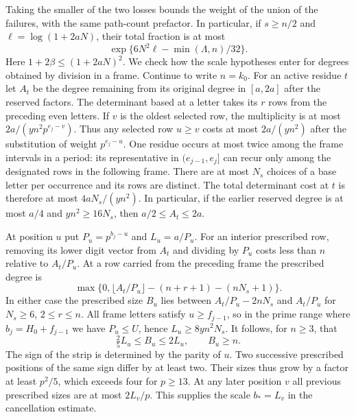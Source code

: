 \documentclass[11pt]{amsart}
\theoremstyle{definition}
\theoremstyle{remark}
\begin{document}
Taking the smaller of the two losses bounds the weight of the
union of the failures, with the same path-count prefactor.
In particular, if $s\ge n/2$ and $\ell=\log(1+2aN)$, their
total fraction is at most
\[
 \exp\{6N^2\ell-\min(\Lambda,n)/32\}.
\]
Here $1+2\beta\le(1+2aN)^2$. We check how the scale hypotheses
enter for degrees obtained by division in a frame. Continue to
write $n=k_0$. For an active residue $t$ let $A_t$ be the degree
remaining from its original degree in $[a,2a]$ after the reserved
factors. The determinant based at a letter takes its $r$ rows
from the preceding even letters. If $v$ is the oldest selected
row, the multiplicity is at most $2a/(yn^2p^{e_j-v})$.
Thus any selected row $u\ge v$ costs at most $2a/(yn^2)$ after
the substitution of weight $p^{e_j-u}$. One residue occurs at most
twice among the frame intervals in a period: its representative
in $(e_{j-1},e_j]$ can recur only among the designated rows in
the following frame. There are at most $N_s$ choices of a base
letter per occurrence and its rows are distinct. The total
determinant cost at $t$ is therefore at most $4aN_s/(yn^2)$.
In particular, if the earlier reserved degree is at most $a/4$
and $yn^2\ge16N_s$, then $a/2\le A_t\le2a$.

At position $u$ put $P_u=p^{b_j-u}$ and $L_u=a/P_u$.
For an interior prescribed row, removing its lower digit vector
from $A_t$ and dividing by $P_u$ costs less than $n$ relative
to $A_t/P_u$. At a row carried from the preceding frame the
prescribed degree is
\[
 \max\{0,\lfloor A_t/P_u\rfloor-(n+r+1)-(nN_s+1)\}.
\]
In either case the prescribed size $B_u$ lies between
$A_t/P_u-2nN_s$ and $A_t/P_u$ for $N_s\ge6$, $2\le r\le n$.
All frame letters satisfy $u\ge f_{j-1}$, so in the prime range
where $b_j=H_0+f_{j-1}$ we have $P_u\le U$, hence
$L_u\ge8yn^2N_s$. It follows, for $n\ge3$, that
\[
             \tfrac25 L_u\le B_u\le2L_u,\qquad B_u\ge n .
\]
The sign of the strip is determined by the parity of $u$.
Two successive prescribed positions of the same sign differ by
at least two. Their sizes thus grow by a factor at least $p^2/5$,
which exceeds four for $p\ge13$. At any later position $v$ all
previous prescribed sizes are at most $2L_v/p$. This supplies
the scale $b_*=L_v$ in the cancellation estimate.
\end{document}
